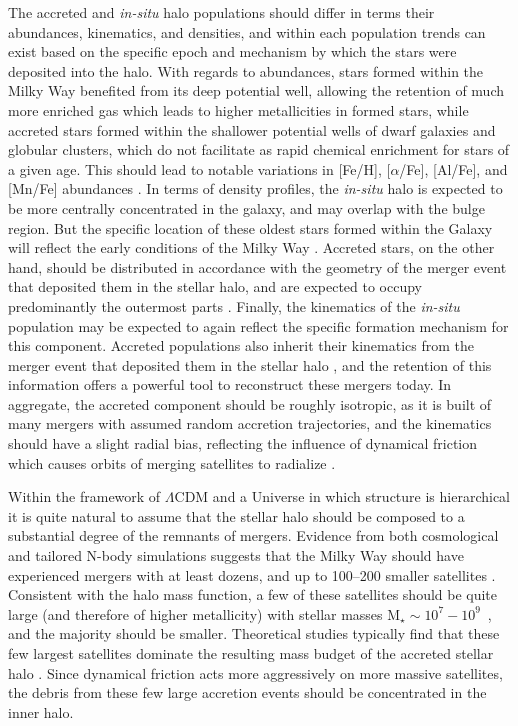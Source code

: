 The accreted and \textit{in-situ} halo populations should differ in terms their abundances, kinematics, and densities, and within each population trends can exist based on the specific epoch and mechanism by which the stars were deposited into the halo. With regards to abundances, stars formed within the Milky Way benefited from its deep potential well, allowing the retention of much more enriched gas which leads to higher metallicities in formed stars, while accreted stars formed within the shallower potential wells of dwarf galaxies and globular clusters, which do not facilitate as rapid chemical enrichment for stars of a given age. This should lead to notable variations in [Fe/H], [$\alpha$/Fe], [Al/Fe], and [Mn/Fe] abundances \parencite{tumlinson10,zolotov10,hawkins15}. In terms of density profiles, the \textit{in-situ} halo is expected to be more centrally concentrated in the galaxy, and may overlap with the bulge region. But the specific location of these oldest stars formed within the Galaxy will reflect the early conditions of the Milky Way \parencite[e.g.][]{el-badry18}. Accreted stars, on the other hand, should be distributed in accordance with the geometry of the merger event that deposited them in the stellar halo, and are expected to occupy predominantly the outermost parts \parencite{abadi06}. Finally, the kinematics of the \textit{in-situ} population may be expected to again reflect the specific formation mechanism for this component. Accreted populations also inherit their kinematics from the merger event that deposited them in the stellar halo \parencite{bullock05,johnston08,cooper10}, and the retention of this information offers a powerful tool to reconstruct these mergers today. In aggregate, the accreted component should be roughly isotropic, as it is built of many mergers with assumed random accretion trajectories, and the kinematics should have a slight radial bias, reflecting the influence of dynamical friction which causes orbits of merging satellites to radialize \parencite{amorisco17,vasiliev22}.

Within the framework of $\Lambda$CDM and a Universe in which structure is hierarchical it is quite natural to assume that the stellar halo should be composed to a substantial degree of the remnants of mergers. Evidence from both cosmological and tailored N-body simulations suggests that the Milky Way should have experienced mergers with at least dozens, and up to 100--200 smaller satellites \parencite{abadi06,fakhouri10,font11,pillepich14}. Consistent with the halo mass function, a few of these satellites should be quite large (and therefore of higher metallicity) with stellar masses M$_{\star} \sim 10^{7}-10^{9}$~\Msun, and the majority should be smaller. Theoretical studies typically find that these few largest satellites dominate the resulting mass budget of the accreted stellar halo \parencite{bullock05,delucia08,cooper10}. Since dynamical friction acts more aggressively on more massive satellites, the debris from these few large accretion events should be concentrated in the inner halo.

